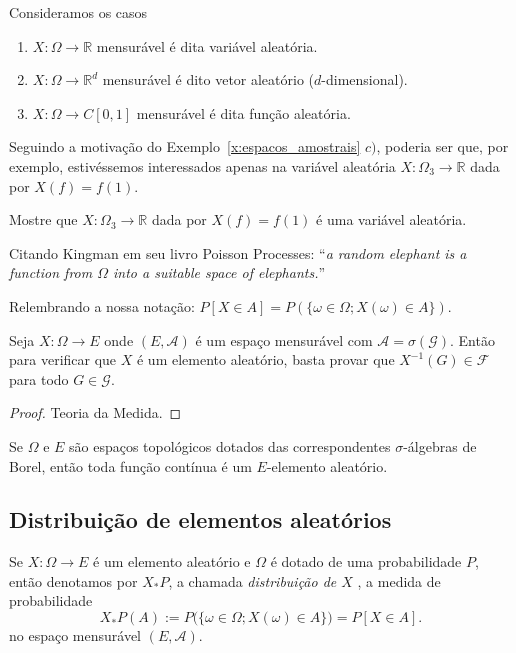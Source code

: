 \begin{example} Consideramos os casos
  \begin{enumerate}[\quad a)]
  \item $X:\Omega \to \mathbb{R}$ mensurável é dita variável aleatória. 
  \item $X:\Omega \to \mathbb{R}^d$ mensurável é dito vetor aleatório ($d$-dimensional).
  \item $X:\Omega \to C[0,1]$ mensurável é dita função aleatória.
  \end{enumerate}
\end{example}
Seguindo a motivação do Exemplo~\ref{x:espacos_amostrais} $c)$, poderia ser que, por exemplo, estivéssemos interessados apenas na variável aleatória $X:\Omega_3 \to \mathbb{R}$ dada por $X(f) = f(1)$.

\begin{exercise}
  Mostre que $X:\Omega_3 \to \mathbb{R}$ dada por $X(f) = f(1)$ é uma variável aleatória.
\end{exercise}

Citando Kingman em seu livro Poisson Processes: ``\emph{a random elephant is a function from $\Omega$ into a suitable space of elephants.}''

Relembrando a nossa notação: $P[X \in A] = P(\{\omega \in \Omega; X(\omega) \in A\})$.

\begin{proposition}
  Seja $X:\Omega \to E$ onde $(E, \mathcal{A})$ é um espaço mensurável com $\mathcal{A} = \sigma(\mathcal{G})$.
  Então para verificar que $X$ é um elemento aleatório, basta provar que $X^{-1}(G) \in \mathcal{F}$ para todo $G \in \mathcal{G}$.
\end{proposition}

\begin{proof}
  Teoria da Medida.
\end{proof}

\begin{example}
  Se $\Omega$ e $E$ são espaços topológicos dotados das correspondentes $\sigma$-álgebras de Borel, então toda função contínua é um $E$-elemento aleatório.
\end{example}

\subsection{Distribuição de elementos aleatórios}

\begin{definition}
  Se $X:\Omega \to E$ é um elemento aleatório e $\Omega$ é dotado de uma probabilidade $P$, então denotamos por $X_{*}P$,
  a chamada \emph{distribuição de $X$} , a medida de probabilidade
  \begin{equation}
    X_* P(A) := P\big( \{\omega \in \Omega; X(\omega) \in A\} \big) = P[X \in A].
  \end{equation}
  no espaço mensurável $(E,\mathcal{A})$.
\end{definition}

